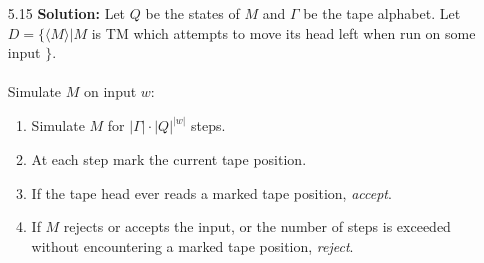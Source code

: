\documentclass{article}
\begin{document}
\begin{enumerate}
    \item[5.15] \textbf{Solution:}
    Let $Q$ be the states of $M$ and $\Gamma$ be the tape alphabet.
    Let $D = \{\langle M\rangle | M $ is TM which attempts to move its head left when run on some input $\}$. \\ \\
    Simulate $M$ on input $w$:
    \begin{enumerate}
        \item Simulate $M$ for $|\Gamma| \cdot |Q|^{|w|}$ steps.
        \item At each step mark the current tape position.
        \item If the tape head ever reads a marked tape position, \textit{accept}.
        \item If $M$ rejects or accepts the input, or the number of steps is exceeded without encountering a marked tape
        position, \textit{reject}.
    \end{enumerate}
\end{enumerate}
\end{document}
